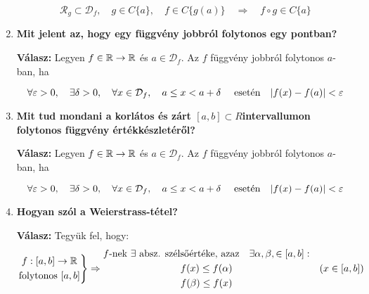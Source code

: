 \documentclass[a4paper,11.5pt]{article}
\begin{document}
\begin{enumerate}
		\[\mathcal{R}_g\subset\mathcal{D}_f, \quad g\in C\{a\}, \quad f\in C\{g(a)\}\quad \Rightarrow\quad  f\circ g\in C\{a\}\]
		
		\item \textbf{Mit jelent az, hogy egy függvény jobbról folytonos egy pontban?}
		
		\textbf{Válasz:} 	Legyen $f\in\mathbb{R}\to\mathbb{R}$ és $a\in\mathcal{D}_f$. Az $f$ függvény  jobbról folytonos $a$-ban, ha
		
		\[\forall \varepsilon>0, \quad \exists \delta>0,\quad  \forall x\in\mathcal{D}_f,\quad  a\leq x< a + \delta \text{ \quad esetén\quad  } |f(x)-f(a)|<\varepsilon  \]
		
		\item \textbf{Mit tud mondani a korlátos és zárt $[a,b] \subset R$\quad intervallumon folytonos
			függvény értékkészletéről?}
		
		\textbf{Válasz:} 	Legyen $f\in\mathbb{R}\to\mathbb{R}$ és $a\in\mathcal{D}_f$. Az $f$ függvény  jobbról folytonos $a$-ban, ha
		
		\[\forall \varepsilon>0, \quad \exists \delta>0,\quad  \forall x\in\mathcal{D}_f,\quad  a\leq x< a + \delta \text{ \quad esetén\quad  } |f(x)-f(a)|<\varepsilon  \]
		
		\item \textbf{Hogyan szól a Weierstrass-tétel?}
		
		\textbf{Válasz:} Tegyük fel, hogy:
		\[ \left.
		\begin{gathered} 
		f: [a,b]\to\mathbb{R} \\
		\text{folytonos } [a,b] 
		\end{gathered}
		\right\} \Rightarrow
		\begin{gathered}
		\text{$f$-nek $\exists$ absz. szélsőértéke, azaz\quad }\exists \alpha, \beta, \in [a,b]: \\
		f(x) \leq f(\alpha) \\
		f(\beta) \leq f(x)
		\end{gathered}\quad (x\in[a,b])\]		
	\end{enumerate}
\end{document}

